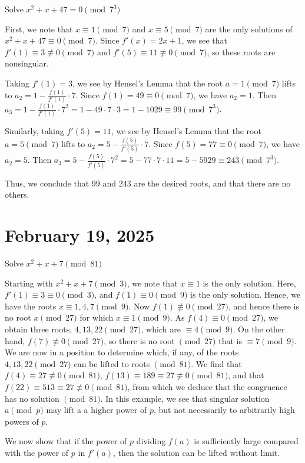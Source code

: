 \documentclass[11pt]{article}
\begin{document}
\begin{example}
	Solve \(x^2 + x + 47 = 0 \pmod{7^3}\)
\end{example}
\begin{solution}
	First, we note that \(x \equiv 1 \pmod{7}\) and \(x \equiv 5 \pmod{7}\) are the only solutions of \(x^2 + x + 47 \equiv 0 \pmod{7}\). Since \(f'(x) = 2x + 1\), we see that \(f'(1) \equiv 3 \not\equiv 0 \pmod{7}\) and \(f'(5) \equiv 11 \not\equiv 0 \pmod{7}\), so these roots are nonsingular.

	Taking \(f'(1) = 3\), we see by Hensel's Lemma that the root \(a = 1 \pmod{7}\) lifts to \(a_2 = 1 - \frac{f(1)}{f'(1)} \cdot 7\). Since \(f(1) = 49 \equiv 0 \pmod{7}\), we have \(a_2 = 1\). Then \(a_3 = 1 - \frac{f(1)}{f'(1)} \cdot 7^2 = 1 - 49 \cdot 7 \cdot 3 = 1 - 1029 \equiv 99 \pmod{7^3}\).

	Similarly, taking \(f'(5) = 11\), we see by Hensel's Lemma that the root \(a = 5 \pmod{7}\) lifts to \(a_2 = 5 - \frac{f(5)}{f'(5)} \cdot 7\). Since \(f(5) = 77 \equiv 0 \pmod{7}\), we have \(a_2 = 5\). Then \(a_3 = 5 - \frac{f(5)}{f'(5)} \cdot 7^2 = 5 - 77 \cdot 7 \cdot 11 = 5 - 5929 \equiv 243 \pmod{7^3}\).

	Thus, we conclude that \(99\) and \(243\) are the desired roots, and that there are no others.
\end{solution}
\section{February 19, 2025}
\begin{example}\label{2.6.12}
	Solve \(x^2 + x + 7 \pmod{81}\)
\end{example}
\begin{solution}
	Starting with \(x^2 + x + 7 \pmod{3}\), we note that \(x \equiv 1\) is the only solution. Here, \(f'(1) \equiv 3 \equiv 0 \pmod{3}\), and \(f(1) \equiv 0 \pmod{9}\) is the only solution. Hence, we have the roots \(x \equiv 1, 4, 7 \pmod{9}\). Now \(f(1) \not\equiv 0 \pmod{27}\), and hence there is no root \(x \pmod{27}\) for which \(x \equiv 1 \pmod{9}\). As \(f(4) \equiv 0 \pmod{27}\), we obtain three roots, \(4, 13, 22 \pmod{27}\), which are \(\equiv 4 \pmod{9}\). On the other hand, \(f(7) \not\equiv 0 \pmod{27}\), so there is no root \(\pmod{27}\) that is \(\equiv 7 \pmod{9}\). We are now in a position to determine which, if any, of the roots \(4, 13, 22 \pmod{27}\) can be lifted to roots \(\pmod{81}\). We find that \(f(4) \equiv 27 \not\equiv 0 \pmod{81}\), \(f(13) \equiv 189 \equiv 27 \not\equiv 0 \pmod{81}\), and that \(f(22) \equiv 513 \equiv 27 \not\equiv 0 \pmod{81}\), from which we deduce that the congruence has no solution \(\pmod{81}\). In this example, we see that singular solution \(a \pmod{p}\) may lift a a higher power of \(p\), but not necessarily to arbitrarily high powers of \(p\).
\end{solution}
We now show that if the power of \(p\) dividing \(f(a)\) is sufficiently large compared with the power of \(p\) in \(f'(a)\), then the solution can be lifted without limit.
\end{document}
